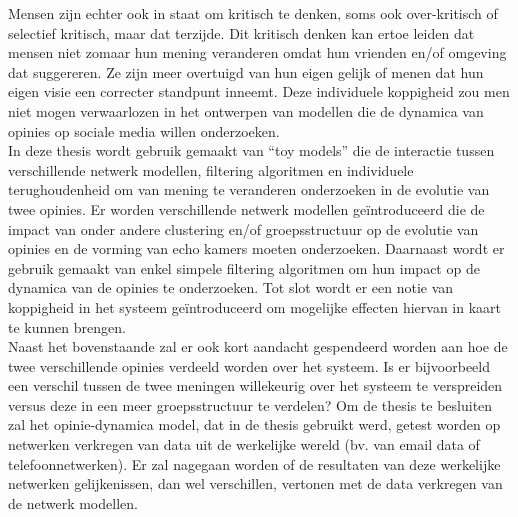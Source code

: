 \documentclass[11 pt , letterpaper , twoside , openright]{book}
\newenvironment{abstract}%
{\cleardoublepage\null \vfill\begin{center}\bfseries \abstractname \end{center}}{\vfill\null}
\begin{document}
\begin{abstract}
Mensen zijn echter ook in staat om kritisch te denken, soms ook over-kritisch of selectief kritisch, maar dat terzijde. Dit kritisch denken kan ertoe leiden dat mensen niet zomaar hun mening veranderen omdat hun vrienden en/of omgeving dat suggereren. Ze zijn meer overtuigd van hun eigen gelijk of menen dat hun eigen visie een correcter standpunt inneemt. Deze individuele koppigheid zou men niet mogen verwaarlozen in het ontwerpen van modellen die de dynamica van opinies op sociale media willen onderzoeken.\\
In deze thesis wordt gebruik gemaakt van ``toy models'' die de interactie tussen verschillende netwerk modellen, filtering algoritmen en individuele terughoudenheid om van mening te veranderen onderzoeken in de evolutie van twee opinies. Er worden verschillende netwerk modellen geïntroduceerd die de impact van onder andere clustering en/of groepsstructuur op de evolutie van opinies en de vorming van echo kamers moeten onderzoeken. Daarnaast wordt er gebruik gemaakt van enkel simpele filtering algoritmen om hun impact op de dynamica van de opinies te onderzoeken. Tot slot wordt er een notie van koppigheid in het systeem geïntroduceerd om mogelijke effecten hiervan in kaart te kunnen brengen. \\
Naast het bovenstaande zal er ook kort aandacht gespendeerd worden aan hoe de twee verschillende opinies verdeeld worden over het systeem. Is er bijvoorbeeld een verschil tussen de twee meningen willekeurig over het systeem te verspreiden versus deze in een meer groepsstructuur te verdelen? Om de thesis te besluiten zal het opinie-dynamica model, dat in de thesis gebruikt werd, getest worden op netwerken verkregen van data uit de werkelijke wereld (bv. van email data of telefoonnetwerken). Er zal nagegaan worden of de resultaten van deze werkelijke netwerken gelijkenissen, dan wel verschillen, vertonen met de data verkregen van de netwerk modellen.
\end{abstract}

\restoregeometry
{}
\tableofcontents
{}
\listoffigures
{}
\listoftables
{}
\restoregeometry

\mainmatter



\pagestyle{fancy}
\fancyhf{}
\lhead{\textcolor{NavyBlue}{\chaptername} \ \textcolor{NavyBlue}{\thechapter}}
\rhead{\rightmark}
\cfoot{\thepage}
\end{document}
